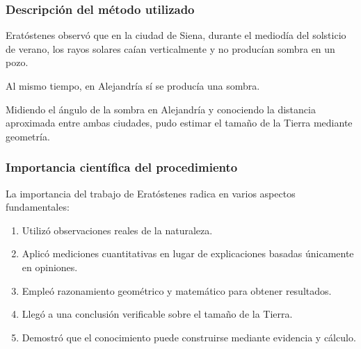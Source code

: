 \documentclass[12pt, a4paper]{article}
\begin{document}
\subsubsection*{Descripción del método utilizado}

Eratóstenes observó que en la ciudad de Siena, durante el mediodía del solsticio de verano, los rayos solares caían verticalmente y no producían sombra en un pozo.

Al mismo tiempo, en Alejandría sí se producía una sombra.

Midiendo el ángulo de la sombra en Alejandría y conociendo la distancia aproximada entre ambas ciudades, pudo estimar el tamaño de la Tierra mediante geometría.

\begin{center}
\end{center}

\subsubsection*{Importancia científica del procedimiento}

La importancia del trabajo de Eratóstenes radica en varios aspectos fundamentales:

\begin{enumerate}[label=\arabic*.]

\item Utilizó observaciones reales de la naturaleza.

\item Aplicó mediciones cuantitativas en lugar de explicaciones basadas únicamente en opiniones.

\item Empleó razonamiento geométrico y matemático para obtener resultados.

\item Llegó a una conclusión verificable sobre el tamaño de la Tierra.

\item Demostró que el conocimiento puede construirse mediante evidencia y cálculo.

\end{enumerate}
\end{document}
